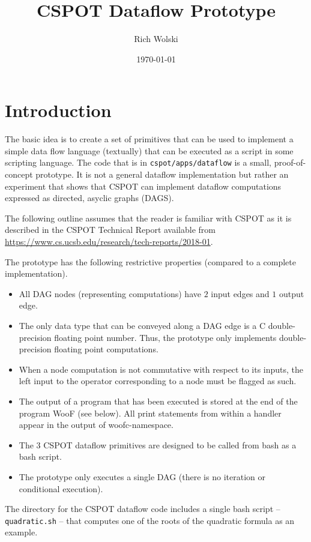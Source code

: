 \documentclass[10pt]{article}
\title{CSPOT Dataflow Prototype}
\author{Rich Wolski}
\date{\today}
\begin{document}
\maketitle

\section{Introduction}

The basic idea is to create a set of primitives that can be used to implement
a simple data flow language (textually) that can be executed as a script in
some scripting language.  The code that is in \verb+cspot/apps/dataflow+ is a
small, proof-of-concept prototype.  It is not a general dataflow
implementation but rather an experiment that shows that CSPOT can implement
dataflow computations expressed as directed, asyclic graphs (DAGS).

The following outline assumes that the reader is familiar with CSPOT as it is
described in the CSPOT Technical Report available from
\url{https://www.cs.ucsb.edu/research/tech-reports/2018-01}.

The prototype has the following restrictive properties (compared to a complete
implementation).
\begin{itemize}
\item All DAG nodes (representing computations) have $2$ input edges and $1$
output edge.
\item The only data type that can be conveyed along a DAG edge is a C
double-precision floating point number.  Thus, the prototype only implements
double-precision floating point computations.
\item When a node computation is not commutative with respect to its inputs,
the left input to the operator corresponding to a node must be flagged as
such.
\item The output of a program that has been executed is stored at the end of
the program WooF (see below).  All print statements from within a handler
appear in the output of woofc-namespace. 
\item The $3$ CSPOT dataflow primitives are designed to be called from bash as
a bash script.
\item The prototype only executes a single DAG (there is no iteration or
conditional execution).
\end{itemize}
The directory for the CSPOT dataflow code includes a single bash script --
\verb+quadratic.sh+ -- that computes one of the roots of the quadratic
formula as an example.
\end{document}
